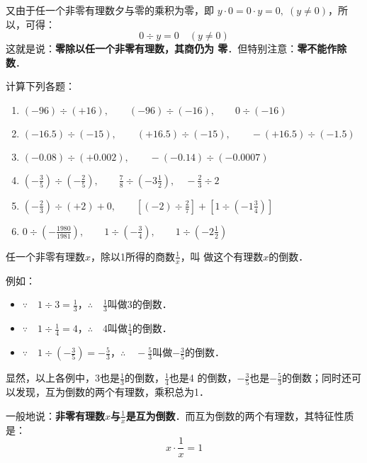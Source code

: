 又由于任一个非零有理数夕与零的乘积为零，即
$y\cdot 0=0\cdot y=0,\; (y\ne 0)$，所以，可得：
              \[0\div y=0\quad  (y\ne 0)\]
    这就是说：\textbf{零除以任一个非零有理数，其商仍为
零}．但特别注意：\textbf{零不能作除数}．


\begin{ex}
计算下列各题：
\begin{enumerate}
    \item $(-96)\div (+16),\qquad (-96)\div (-16),\qquad 0\div (-16)$
    \item $(-16.5)\div (-15),\qquad (+16.5)\div (-15),\qquad -(+16.5)\div (-1.5)$
    \item $(-0.08)\div(+0.002),\qquad -(-0.14)\div (-0.0007)$
    \item $\left(-\frac{3}{5}\right)\div \left(-\frac{2}{5}\right),\qquad \frac{7}{8}\div \left(-3\frac{1}{2}\right),\quad -\frac{2}{3}\div 2$
    \item $\left(-\frac{2}{3}\right)\div (+2) +0,\qquad \left[(-2)\div \frac{2}{7}\right]+\left[1\div\left(-1\frac{3}{4}\right)\right]$
    \item $0\div \left(-\frac{1980}{1981}\right),\qquad 1\div\left(-\frac{3}{4}\right),\qquad 1\div\left(-2\frac{1}{2}\right)$
\end{enumerate}
\end{ex}

\begin{blk}{}
    任一个非零有理数$x$，除以1所得的商数$\frac{1}{x}$，叫
做这个有理数$x$的倒数．
\end{blk}

例如：
\begin{itemize}
    \item $\because\quad 1\div 3=\frac{1}{3}$，\qquad $\therefore\quad \frac{1}{3}$叫做3的倒数．
    \item $\because\quad 1\div \frac{1}{4}=4$，\qquad $\therefore\quad 4$叫做$\frac{1}{4}$的倒数．
    \item $\because\quad 1\div \left(-\frac{3}{5}\right)=-\frac{5}{3}$，\qquad  $\therefore\quad -\frac{5}{3}$叫做$-\frac{3}{5}$的倒数．
\end{itemize}

  显然，以上各例中，3也是$\frac{1}{3}$的倒数，$\frac{1}{4}$也是4
的倒数，$-\frac{3}{5}$也是$-\frac{5}{3}$的倒数；同时还可以发现，互为倒数的两个有理数，乘积总为1．

  一般地说：\textbf{非零有理数$x$与$\frac{1}{x}$是互为倒数}．而互为倒数的两个有理数，其特征性质是：
\[x\cdot \frac{1}{x}=1\]
  
